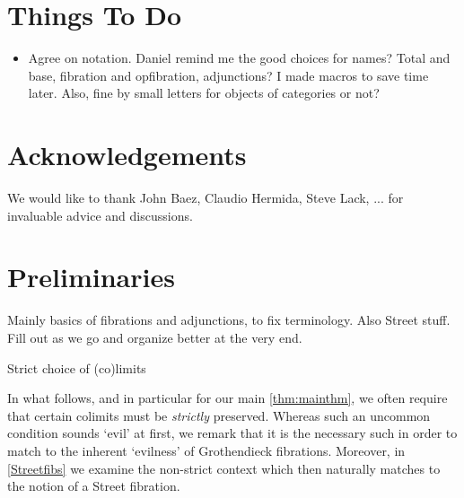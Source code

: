 \documentclass{amsart}
\begin{document}
\section*{Things To Do}
\begin{itemize}
 \item Agree on notation. {\chris Daniel remind me the good choices for names? Total and base, fibration and opfibration, adjunctions? I made macros to save time later. Also, fine by small letters for objects of categories or not?}
\end{itemize}

\section*{Acknowledgements} We would like to thank John Baez, Claudio Hermida, Steve Lack, ... for invaluable advice and discussions.

\section{Preliminaries}\label{sec:preliminaries}

{\chris Mainly basics of fibrations and adjunctions, to fix terminology. Also Street stuff. Fill out as we go and organize better at the very end.
}

{\chris Strict choice of (co)limits}

In what follows, and in particular for our main \cref{thm:mainthm}, we often require that certain colimits must be \emph{strictly} preserved. Whereas such an uncommon condition sounds `evil' at first, we remark that it is the necessary such in order to match to the inherent `evilness' of Grothendieck fibrations. Moreover, in \cref{Streetfibs} we examine the non-strict context which then naturally matches to the notion of a Street fibration.
\end{document}
